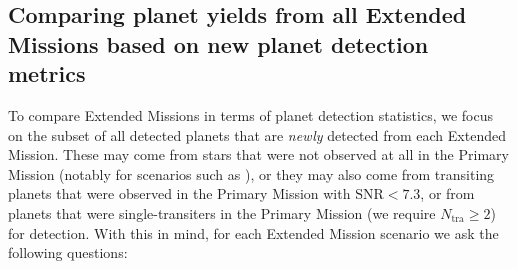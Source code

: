 \subsection{Comparing planet yields from all Extended Missions based on new planet detection metrics}
\label{sec:results_from_all_extended_missions}
To compare Extended Missions in terms of planet detection statistics, we focus on the subset of all detected planets that are \textit{newly} detected from each Extended Mission.
These may come from stars that were not observed at all in the Primary Mission (notably for scenarios such as \elong), or they may also come from transiting planets that were observed in the Primary Mission with $\mathrm{SNR}<7.3$, or from planets that were single-transiters in the Primary Mission (we require $N_\mathrm{tra}\geq2$) for detection.
With this in mind, for each Extended Mission scenario we ask the following questions:

